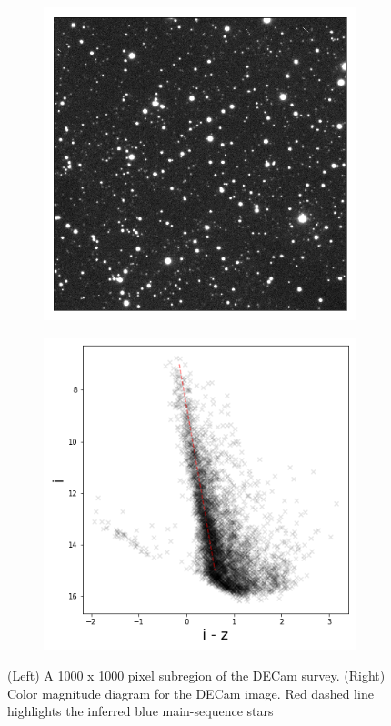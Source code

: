 \begin{figure}[!htb]
    \centering
    \begin{subfigure}[T]{0.45\textwidth}
    \centering
    \includegraphics[width=\textwidth]{./figures/decaps/example_subimage1000_decaps.png}
    \end{subfigure}
    \hfill
    \begin{subfigure}[T]{0.5\textwidth}
    \centering
    \includegraphics[width=\textwidth]{./figures/decaps/decaps_cmd.png}
    \end{subfigure}
    \caption{(Left) A 1000 x 1000 pixel subregion of the DECam survey. 
    (Right) Color magnitude diagram for the DECam image. Red dashed line highlights
    the inferred blue main-sequence stars}
    \label{fig:decaps}
\end{figure}


